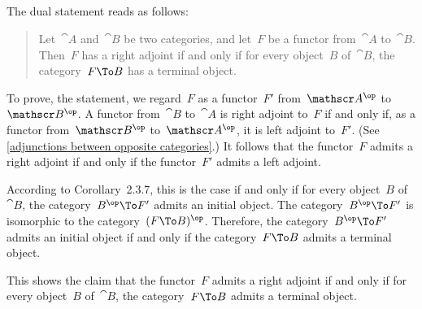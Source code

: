 \subsection{}

The dual statement reads as follows:
\begin{quote}
	Let~$\cat{A}$ and~$\cat{B}$ be two categories, and let~$F$ be a functor from~$\cat{A}$ to~$\cat{B}$.
	Then~$F$ has a right adjoint if and only if for every object~$B$ of~$\cat{B}$, the category~$F \To B$ has a terminal object.
\end{quote}

To prove, the statement, we regard~$F$ as a functor~$F'$ from~$\cat{A}^{\op}$ to~$\cat{B}^{\op}$.
A functor from~$\cat{B}$ to~$\cat{A}$ is right adjoint to~$F$ if and only if, as a functor from~$\cat{B}^{\op}$ to~$\cat{A}^{\op}$, it is left adjoint to~$F'$.
(See \cref{adjunctions between opposite categories}.)
It follows that the functor~$F$ admits a right adjoint if and only if the functor~$F'$ admits a left adjoint.

According to Corollary~2.3.7, this is the case if and only if for every object~$B$ of~$\cat{B}$, the category~$B^{\op} \To F'$ admits an initial object.
The category~$B^{\op} \To F'$ is isomorphic to the category~$(F \To B)^{\op}$.
Therefore, the category~$B^{\op} \To F'$ admits an initial object if and only if the category~$F \To B$ admits a terminal object.

This shows the claim that the functor~$F$ admits a right adjoint if and only if for every object~$B$ of~$\cat{B}$, the category~$F \To B$ admits a terminal object.
